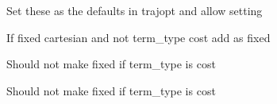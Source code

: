 \begin{DoxyRefList}
\label{todo__todo000031}%
%
Set these as the defaults in trajopt and allow setting  
\item[Member \mbox{\hyperlink{classtesseract__planning_1_1TrajOptMotionPlanner_a6f42bc4743b8be6fd310b7e75282796d}{tesseract\+\_\+planning\+::Traj\+Opt\+Motion\+Planner\+::create\+Problem}} (const \mbox{\hyperlink{structtesseract__planning_1_1PlannerRequest}{Planner\+Request}} \&request) const]\label{todo__todo000027}%
%
If fixed cartesian and not term\+\_\+type cost add as fixed 

\label{todo__todo000028}%
%
Should not make fixed if term\+\_\+type is cost 

\label{todo__todo000029}%
%
Should not make fixed if term\+\_\+type is cost 
\end{DoxyRefList}